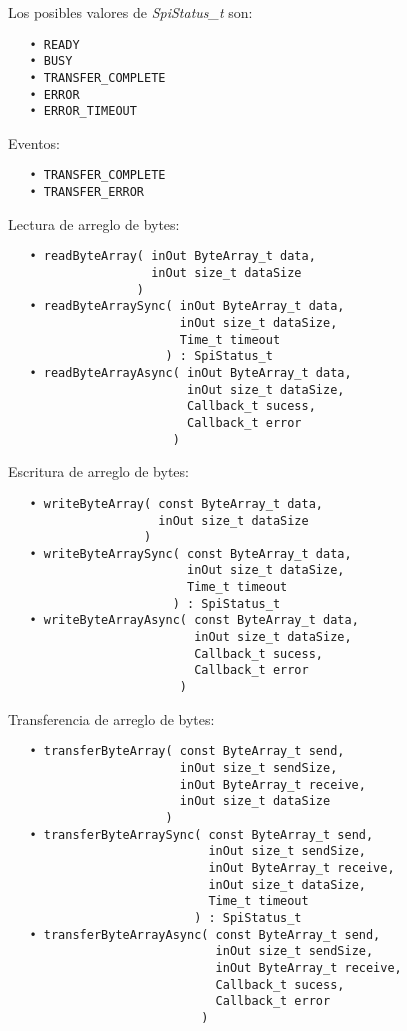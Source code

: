 Los posibles valores de \emph{SpiStatus\_t} son:

\begin{verbatim}
   • READY
   • BUSY
   • TRANSFER_COMPLETE
   • ERROR
   • ERROR_TIMEOUT
\end{verbatim}

Eventos:

\begin{verbatim}
   • TRANSFER_COMPLETE
   • TRANSFER_ERROR
\end{verbatim}



Lectura de arreglo de bytes:

\begin{verbatim}
   • readByteArray( inOut ByteArray_t data,
                    inOut size_t dataSize
                  )
   • readByteArraySync( inOut ByteArray_t data,
                        inOut size_t dataSize,
                        Time_t timeout
                      ) : SpiStatus_t
   • readByteArrayAsync( inOut ByteArray_t data, 
                         inOut size_t dataSize,
                         Callback_t sucess,
                         Callback_t error 
                       )
\end{verbatim}

Escritura de arreglo de bytes:

\begin{verbatim}
   • writeByteArray( const ByteArray_t data,
                     inOut size_t dataSize
                   )
   • writeByteArraySync( const ByteArray_t data,
                         inOut size_t dataSize,
                         Time_t timeout
                       ) : SpiStatus_t
   • writeByteArrayAsync( const ByteArray_t data, 
                          inOut size_t dataSize,
                          Callback_t sucess,
                          Callback_t error 
                        )
\end{verbatim}

Transferencia de arreglo de bytes:

\begin{verbatim}
   • transferByteArray( const ByteArray_t send,
                        inOut size_t sendSize,
                        inOut ByteArray_t receive,
                        inOut size_t dataSize
                      )
   • transferByteArraySync( const ByteArray_t send,
                            inOut size_t sendSize,
                            inOut ByteArray_t receive,
                            inOut size_t dataSize,
                            Time_t timeout
                          ) : SpiStatus_t
   • transferByteArrayAsync( const ByteArray_t send,
                             inOut size_t sendSize,
                             inOut ByteArray_t receive,
                             Callback_t sucess,
                             Callback_t error 
                           )
\end{verbatim}

